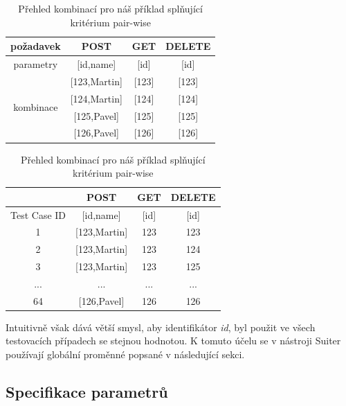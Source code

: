 \begin{table}[h]
\centering
\begin{tabular}{ |c||c|c||c||c| } 
 \hline
požadavek & \multicolumn{2}{c||}{POST} & GET & DELETE \\
 \hline
 \hline
parametry & \multicolumn{2}{c||}{[id,name]} & [id] & [id] \\
 \hline
\multirow{4}{*}{kombinace} & \multicolumn{2}{c||}{[123,Martin]} & [123] & [123] \\
& \multicolumn{2}{c||}{[124,Martin]} & [124] & [124] \\
& \multicolumn{2}{c||}{[125,Pavel]}  & [125] & [125] \\
& \multicolumn{2}{c||}{[126,Pavel]}& [126] & [126] \\
 \hline
\end{tabular}
\caption{Přehled kombinací pro náš příklad splňující kritérium pair-wise}
\label{table_KombinaceTretiUroven}
\end{table}
\begin{table}[h]
\centering
\begin{tabular}{ |c||c|c||c||c| } 
 \hline
 & \multicolumn{2}{c||}{POST} & GET & DELETE \\
 \hline
 \hline
 Test Case ID & \multicolumn{2}{c||}{[id,name]} & [id] & [id] \\
 \hline
1 & \multicolumn{2}{c||}{[123,Martin]} & 123 & 123 \\
2 & \multicolumn{2}{c||}{[123,Martin]} & 123 & 124 \\
3 & \multicolumn{2}{c||}{[123,Martin]} & 123 & 125 \\
... & \multicolumn{2}{c||}{...} & ... & ... \\
64 & \multicolumn{2}{c||}{[126,Pavel]} & 126 & 126 \\
 \hline
\end{tabular}
\caption{Přehled kombinací pro náš příklad splňující kritérium pair-wise}
\label{table_ExampleTretiUrovenVysledek}
\end{table}

Intuitivně však dává větší smysl, aby identifikátor \textit{id}, byl použit ve všech testovacích případech se stejnou hodnotou. K tomuto účelu se v nástroji Suiter používají globální proměnné popsané v následující sekci.


\subsection*{Specifikace parametrů}
\label{subsec_SpecifikaceParam}

